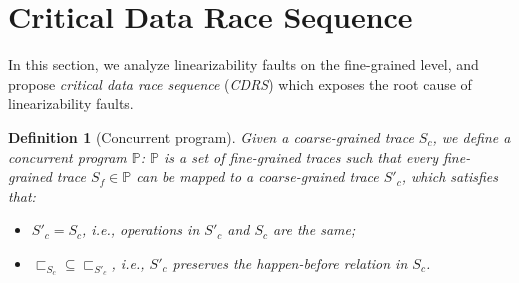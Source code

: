 \documentclass[runningheads]{llncs}
\newcommand{\p}{\mathbb{P} }
\newcommand{\ft}{S_f}
\newcommand{\ct}{S_c}
\newtheorem{myDef}{Definition}
\begin{document}
\section{Critical Data Race Sequence}\label{sec:criticaldataraces}



In this section, we analyze linearizability faults on the fine-grained level, and propose \textit{critical data race sequence} (\textit{CDRS}) which exposes the root cause of linearizability faults.



\begin{myDef}[Concurrent program]\label{def:concurrentprogram}
Given a coarse-grained trace $\ct$, we define a concurrent program $\p$:
$\p$ 
 is a set of fine-grained traces such that
every fine-grained trace $\ft \in \p$ can be mapped to a coarse-grained trace $S'_c$, which satisfies that: 
\begin{itemize}
  \item $S'_c = S_c$, i.e., operations in $S'_c$ and $S_c$ are the same;
  \item $\sqsubset_{S_c}\subseteq \sqsubset_{S'_c}$, i.e., $S'_c$ preserves the \textit{happen-before} relation in $S_c$.
\end{itemize}
\end{myDef}
\end{document}
